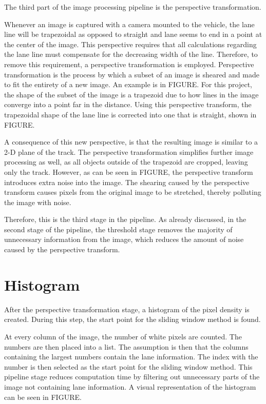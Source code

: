 \documentclass[arbeit=studie,oneside,BCOR=12mm]{ArbeitRST}
\begin{document}
The third part of the image processing pipeline is the perspective 
transformation. 

Whenever an image is captured with a camera mounted to the vehicle, the lane
line will be trapezoidal as opposed to straight and lane seems to end in a
point at the center of the image. This perspective requires that all
calculations regarding the lane line must compensate for the decreasing width
of the line. Therefore, to remove this requirement, a perspective
transformation is employed. Perspective transformation is the process by which
a subset of an image is sheared and made to fit the entirety of a new image. An
example is in FIGURE. For this project, the shape of the subset of the image is
a trapezoid due to how lines in the image converge into a point far in the
distance. Using this perspective transform, the trapezoidal shape of the lane
line is corrected into one that is straight, shown in FIGURE.

A consequence of this new perspective, is that the resulting image is similar
to a 2-D plane of the track. The perspective transformation simplifies further
image processing as well, as all objects outside of the trapezoid are cropped,
leaving only the track. However, as can be seen in FIGURE, the perspective
transform introduces extra noise into the image. The shearing caused by the
perspective transform causes pixels from the original image to be stretched,
thereby polluting the image with noise. 

Therefore, this is the third stage in the pipeline. As already discussed, in 
the second stage of the pipeline, the threshold stage removes the majority of 
unnecessary information from the image, which reduces the amount of noise 
caused by the perspective transform.

\section{Histogram}

\iffalse

After the perspective transformation stage, a histogram of the pixel density 
is created. During this step, the start point for the sliding window method is
found. 

At every column of the image, the number of white pixels are counted. 
The numbers are then placed into a list. The assumption is then that the 
columns containing the largest numbers contain the lane information. The 
index with the number is then selected as the start point for the sliding 
window method. This pipeline stage reduces computation time by filtering out 
unnecessary parts of the image not containing lane information. A visual 
representation of the histogram can be seen in FIGURE.
\end{document}

